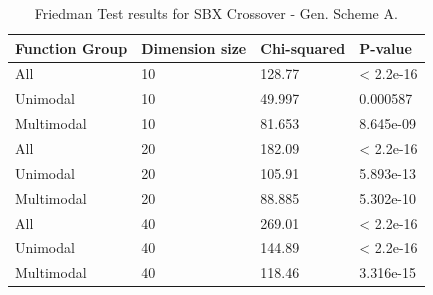 \begin{table}[h]
	\centering
	\begin{tabular}{|l|l|l|l|}
		\hline
		\textbf{Function Group} & \textbf{Dimension size}      & \textbf{Chi-squared}        & \textbf{P-value}                     \\ \hline
		\multicolumn{1}{|l|}{All} & \multicolumn{1}{|l|}{10} & \multicolumn{1}{l|}{128.77} & \multicolumn{1}{l|}{< 2.2e-16} \\ \hline
		\multicolumn{1}{|l|}{Unimodal} & \multicolumn{1}{|l|}{10} & \multicolumn{1}{l|}{49.997} & \multicolumn{1}{l|}{0.000587} \\ \hline
		\multicolumn{1}{|l|}{Multimodal} & \multicolumn{1}{|l|}{10} & \multicolumn{1}{l|}{81.653} & \multicolumn{1}{l|}{8.645e-09}  \\ \hline
		\hline
		\multicolumn{1}{|l|}{All} & \multicolumn{1}{|l|}{20} & \multicolumn{1}{l|}{182.09} & \multicolumn{1}{l|}{< 2.2e-16} \\ \hline
		\multicolumn{1}{|l|}{Unimodal} & \multicolumn{1}{|l|}{20} & \multicolumn{1}{l|}{105.91} & \multicolumn{1}{l|}{5.893e-13} \\ \hline
		\multicolumn{1}{|l|}{Multimodal} & \multicolumn{1}{|l|}{20} & \multicolumn{1}{l|}{88.885} & \multicolumn{1}{l|}{5.302e-10}  \\ \hline
		\hline
		\multicolumn{1}{|l|}{All} & \multicolumn{1}{|l|}{40} & \multicolumn{1}{l|}{269.01} & \multicolumn{1}{l|}{< 2.2e-16} 						\\ \hline
		\multicolumn{1}{|l|}{Unimodal} & \multicolumn{1}{|l|}{40} & \multicolumn{1}{l|}{144.89} & \multicolumn{1}{l|}{< 2.2e-16} \\ \hline
		\multicolumn{1}{|l|}{Multimodal} & \multicolumn{1}{|l|}{40} & \multicolumn{1}{l|}{118.46} & \multicolumn{1}{l|}{3.316e-15}  \\ \hline
	\end{tabular}
	\caption{Friedman Test results for SBX Crossover - Gen. Scheme A.}
	\label{Friedman_test_sbx}	
\end{table}

